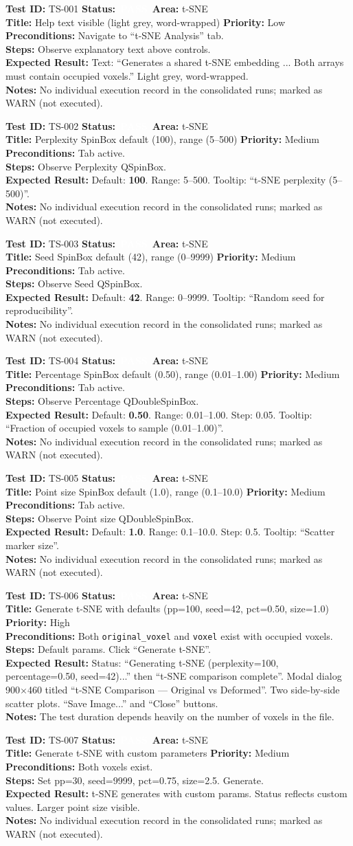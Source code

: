 \documentclass[12pt,a4paper]{article}
\newcommand{\statuspass}{\colorbox{statusgreen}{\textcolor{white}{\textbf{\,PASS\,}}}}
\newcommand{\testcase}[9]{%
  \smallskip
  \noindent\textbf{Test ID:} #1 \hfill \textbf{Status:} #2 \hfill \textbf{Area:} #3 \\
  \textbf{Title:} #4 \hfill \textbf{Priority:} #5 \\[0.3em]
  \textbf{Preconditions:} #6 \\[0.3em]
  \textbf{Steps:} #7 \\[0.3em]
  \textbf{Expected Result:} #8 \\
  \textbf{Notes:} #9
  \smallskip
}
\begin{document}
\testcase{TS-001}{\statuspass}{t-SNE}{Help text visible (light grey, word-wrapped)}{Low}{Navigate to ``t-SNE Analysis'' tab.}{Observe explanatory text above controls.}{Text: ``Generates a shared t-SNE embedding ... Both arrays must contain occupied voxels.'' Light grey, word-wrapped.}{No individual execution record in the consolidated runs; marked as WARN (not executed).}


\testcase{TS-002}{\statuspass}{t-SNE}{Perplexity SpinBox default (100), range (5--500)}{Medium}{Tab active.}{Observe Perplexity QSpinBox.}{Default: \textbf{100}. Range: 5--500. Tooltip: ``t-SNE perplexity (5--500)''.}{No individual execution record in the consolidated runs; marked as WARN (not executed).}


\testcase{TS-003}{\statuspass}{t-SNE}{Seed SpinBox default (42), range (0--9999)}{Medium}{Tab active.}{Observe Seed QSpinBox.}{Default: \textbf{42}. Range: 0--9999. Tooltip: ``Random seed for reproducibility''.}{No individual execution record in the consolidated runs; marked as WARN (not executed).}


\testcase{TS-004}{\statuspass}{t-SNE}{Percentage SpinBox default (0.50), range (0.01--1.00)}{Medium}{Tab active.}{Observe Percentage QDoubleSpinBox.}{Default: \textbf{0.50}. Range: 0.01--1.00. Step: 0.05. Tooltip: ``Fraction of occupied voxels to sample (0.01--1.00)''.}{No individual execution record in the consolidated runs; marked as WARN (not executed).}


\testcase{TS-005}{\statuspass}{t-SNE}{Point size SpinBox default (1.0), range (0.1--10.0)}{Medium}{Tab active.}{Observe Point size QDoubleSpinBox.}{Default: \textbf{1.0}. Range: 0.1--10.0. Step: 0.5. Tooltip: ``Scatter marker size''.}{No individual execution record in the consolidated runs; marked as WARN (not executed).}


\testcase{TS-006}{\statuspass}{t-SNE}{Generate t-SNE with defaults (pp=100, seed=42, pct=0.50, size=1.0)}{High}{Both \texttt{original\_voxel} and \texttt{voxel} exist with occupied voxels.}{Default params. Click ``Generate t-SNE''.}{Status: ``Generating t-SNE (perplexity=100, percentage=0.50, seed=42)...'' then ``t-SNE comparison complete''. Modal dialog 900$\times$460 titled ``t-SNE Comparison --- Original vs Deformed''. Two side-by-side scatter plots. ``Save Image...'' and ``Close'' buttons.}{The test duration depends heavily on the number of voxels in the file.}


\testcase{TS-007}{\statuspass}{t-SNE}{Generate t-SNE with custom parameters}{Medium}{Both voxels exist.}{Set pp=30, seed=9999, pct=0.75, size=2.5. Generate.}{t-SNE generates with custom params. Status reflects custom values. Larger point size visible.}{No individual execution record in the consolidated runs; marked as WARN (not executed).}
\end{document}
